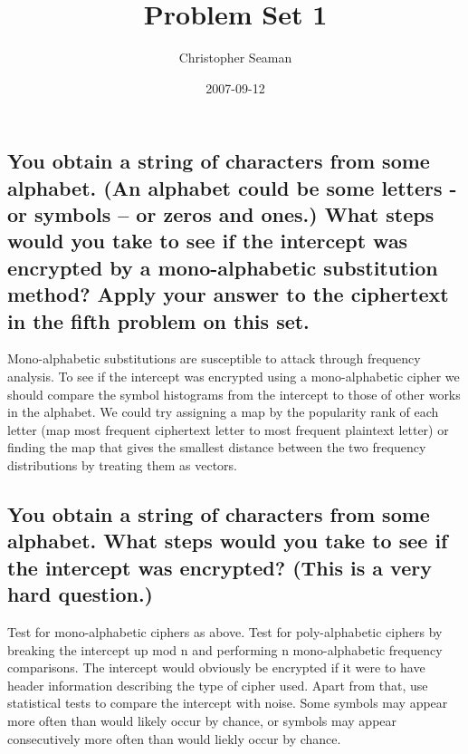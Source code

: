 \documentclass[]{article}
\title{Problem Set 1}
\author{Christopher Seaman}
\date{2007-09-12}
\begin{document}
\ifpdf
{}
\else
{}
\fi

\maketitle


\section{}
\subsection{You obtain a string of characters from some alphabet. (An alphabet could be some letters - or symbols – or zeros and ones.) What steps would you take to see if the intercept was encrypted by a mono-alphabetic substitution method? Apply your answer to the ciphertext in the fifth problem on this set.}

Mono-alphabetic substitutions are susceptible to attack through frequency analysis. To see if the intercept was encrypted using a mono-alphabetic cipher we should compare the symbol histograms from the intercept to those of other works in the alphabet.  We could try assigning a map by the popularity rank of each letter (map most frequent ciphertext letter to most frequent plaintext letter) or finding the map that gives the smallest distance between the two frequency distributions by treating them as vectors.


\subsection{You obtain a string of characters from some alphabet. What steps would you take to see if the intercept was encrypted? (This is a very hard question.)}
Test for mono-alphabetic ciphers as above. Test for poly-alphabetic ciphers by breaking the intercept up mod n and performing n mono-alphabetic frequency comparisons.  The intercept would obviously be encrypted if it were to have header information describing the type of cipher used.  Apart from that, use statistical tests to compare the intercept with noise.  Some symbols may appear more often than would likely occur by chance, or symbols may appear consecutively more often than would liekly occur by chance.



\section{}
\end{document}
